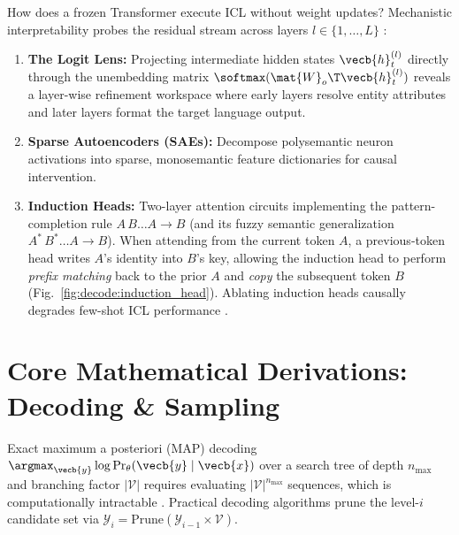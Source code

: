 \documentclass[../../../../master.tex]{subfiles}
\begin{document}
\begin{intuition}
How does a frozen Transformer execute ICL without weight updates? Mechanistic interpretability probes the residual stream across layers $l \in \{1, \dots, L\}$ :
\begin{enumerate}
  \item \textbf{The Logit Lens:} Projecting intermediate hidden states $\vecb{h}_t^{(l)}$ directly through the unembedding matrix $\softmax(\mat{W}_o\T \vecb{h}_t^{(l)})$ reveals a layer-wise refinement workspace where early layers resolve entity attributes and later layers format the target language output.
  \item \textbf{Sparse Autoencoders (SAEs):} Decompose polysemantic neuron activations into sparse, monosemantic feature dictionaries for causal intervention.
  \item \textbf{Induction Heads:} Two-layer attention circuits implementing the pattern-completion rule $A\,B \dots A \to B$ (and its fuzzy semantic generalization $A^*\,B^* \dots A \to B$). When attending from the current token $A$, a previous-token head writes $A$'s identity into $B$'s key, allowing the induction head to perform \emph{prefix matching} back to the prior $A$ and \emph{copy} the subsequent token $B$ (Fig.~\ref{fig:decode:induction_head}). Ablating induction heads causally degrades few-shot ICL performance .
\end{enumerate}
\end{intuition}


\section{Core Mathematical Derivations: Decoding \& Sampling}\label{sec:decode:decoding}

Exact maximum a posteriori (MAP) decoding $\argmax_{\vecb{y}} \log \Pr_{\theta}(\vecb{y} \mid \vecb{x})$ over a search tree of depth $n_{\max}$ and branching factor $|\mathcal{V}|$ requires evaluating $|\mathcal{V}|^{n_{\max}}$ sequences, which is computationally intractable . Practical decoding algorithms prune the level-$i$ candidate set via $\mathcal{Y}_i = \mathrm{Prune}(\mathcal{Y}_{i-1} \times \mathcal{V})$.
\end{document}
